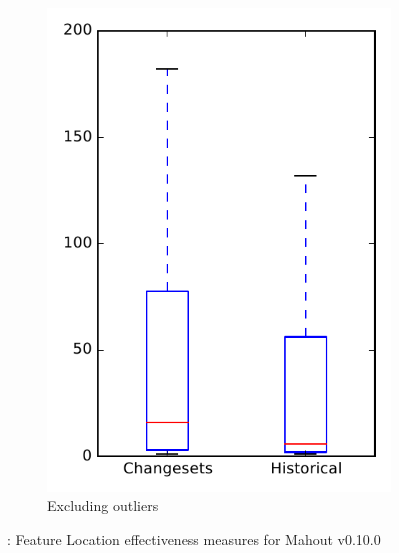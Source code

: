 \begin{figure}
\begin{subfigure}{.4\textwidth}
        \includegraphics[height=0.4\textheight]{figures/flt/rq2_mahout_no_outlier}
        \caption{Excluding outliers}\label{fig:flt:rq2:mahout_no_outlier}
    \end{subfigure}
\caption{\ftwo: Feature Location effectiveness measures for Mahout v0.10.0}
\label{fig:flt:rq2:mahout}
\end{figure}
